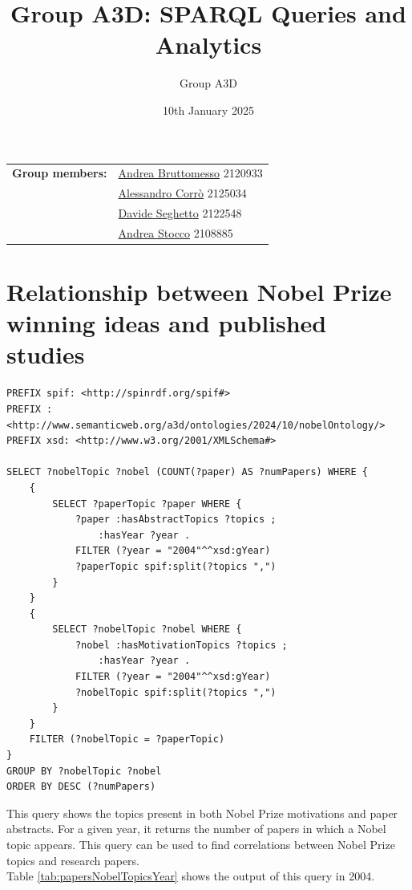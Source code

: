\documentclass{article}
\title{Group A3D: SPARQL Queries and Analytics}
\author{Group A3D}
\date{10th January 2025}
\begin{document}
\maketitle

\begin{tabular}{@{}ll}
	\textbf{Group members:}
	 & \href{mailto:andrea.bruttomesso.1@studenti.unipd.it}{Andrea Bruttomesso} 2120933 \\
	 & \href{mailto:alessandro.corro.1@studenti.unipd.it}{Alessandro Corr\`o} 2125034   \\
	 & \href{mailto:davide.seghetto@studenti.unipd.it}{Davide Seghetto} 2122548         \\
	 & \href{mailto:andrea.stocco.8@studenti.unipd.it}{Andrea Stocco} 2108885           \\
\end{tabular}

\section{Relationship between Nobel Prize winning ideas and published studies}
\begin{lstlisting}
PREFIX spif: <http://spinrdf.org/spif#>
PREFIX : <http://www.semanticweb.org/a3d/ontologies/2024/10/nobelOntology/>
PREFIX xsd: <http://www.w3.org/2001/XMLSchema#>

SELECT ?nobelTopic ?nobel (COUNT(?paper) AS ?numPapers) WHERE {
    {
        SELECT ?paperTopic ?paper WHERE {
            ?paper :hasAbstractTopics ?topics ;
               	:hasYear ?year .
            FILTER (?year = "2004"^^xsd:gYear)
            ?paperTopic spif:split(?topics ",")
        }
    }
    {
        SELECT ?nobelTopic ?nobel WHERE {
            ?nobel :hasMotivationTopics ?topics ;
                :hasYear ?year .
            FILTER (?year = "2004"^^xsd:gYear)
            ?nobelTopic spif:split(?topics ",")
        }
    }
    FILTER (?nobelTopic = ?paperTopic)
}
GROUP BY ?nobelTopic ?nobel
ORDER BY DESC (?numPapers)
\end{lstlisting}

\vspace{1em}

This query shows the topics present in both Nobel Prize motivations and paper abstracts.
For a given year, it returns the number of papers in which a Nobel topic appears.
This query can be used to find correlations between Nobel Prize topics and research
papers.\\
Table \ref{tab:papersNobelTopicsYear} shows the output of this query in 2004.
\end{document}
